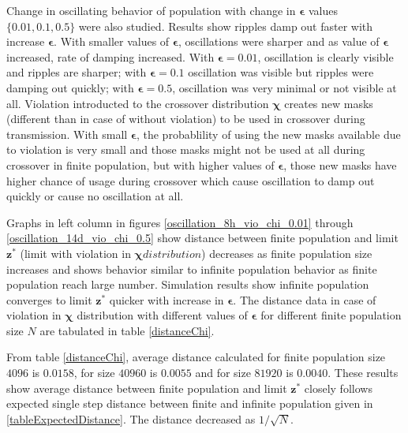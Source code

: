 Change in oscillating behavior of population with change in $\bm{\epsilon}$ values $\{0.01, 0.1, 0.5\}$ were also studied. 
Results show ripples damp out faster with increase $\bm{\epsilon}$.
With smaller values of $\bm{\epsilon}$, oscillations were sharper and as value of $\bm{\epsilon}$ increased, 
rate of damping increased. With $\bm{\epsilon} = 0.01$, oscillation is clearly visible and ripples are sharper; with $\bm{\epsilon} = 0.1$ oscillation was visible 
but ripples were damping out quickly;  with $\bm{\epsilon} = 0.5$, oscillation was very minimal or not visible at all. 
Violation introducted to the crossover distribution $\bm{\chi}$ creates new masks (different than in case of without violation) to be used in crossover 
during transmission. With small $\bm{\epsilon}$, the probablility of using the new masks available due to violation is very small and 
those masks might not be used at all during crossover in finite population, but with higher values of $\bm{\epsilon}$, 
those new masks have higher chance of usage during crossover which cause oscillation to damp out quickly or cause no oscillation at all.

Graphs in left column in figures \ref{oscillation_8h_vio_chi_0.01} through \ref{oscillation_14d_vio_chi_0.5} show distance 
between finite population and limit $\bm{z}^\ast$ (limit with violation in $\bm{\chi} distribution$) decreases as finite population size increases 
and shows behavior similar to infinite population behavior as finite population reach large number. Simulation results show infinite population converges 
to limit $\bm{z^\ast}$ quicker with increase in $\bm{\epsilon}$. The distance data in case of violation in $\bm{\chi}$ distribution 
with different values of $\bm{\epsilon}$ for different finite population size $N$ are tabulated in table \ref{distanceChi}.



From table \ref{distanceChi}, 
average distance calculated for finite population size $4096$ is $0.0158$, 
for size $40960$ is $0.0055$ and for size $81920$ is $0.0040$.
These results show average distance 
between finite population and limit $\bm{z^\ast}$ closely follows expected single step distance 
between finite and infinite population given in \ref{tableExpectedDistance}. The distance decreased as $1/\sqrt{N}$.

